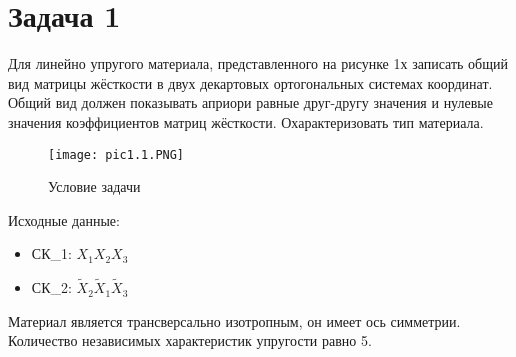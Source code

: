 \section{Задача 1}

Для линейно упругого материала, представленного на рисунке 1х записать
общий вид матрицы жёсткости в двух декартовых ортогональных системах
координат. Общий вид должен показывать априори равные друг-другу значения
и нулевые значения коэффициентов матриц жёсткости. Охарактеризовать тип
материала.

\begin{figure}[H]
    \begin{center}
        \texttt{[image: pic1.1.PNG]}
        \caption{Условие задачи}
        \label{pic1.1}
    \end{center}
\end{figure}

Исходные данные:
\begin{itemize}
    \item СК\_1: $X_1X_2X_3$
    \item СК\_2: $\tilde{X}_2 \tilde{X}_1 \tilde{X}_3$
\end{itemize}

Материал является трансверсально изотропным, он имеет ось симметрии. Количество независимых характеристик упругости равно 5.

